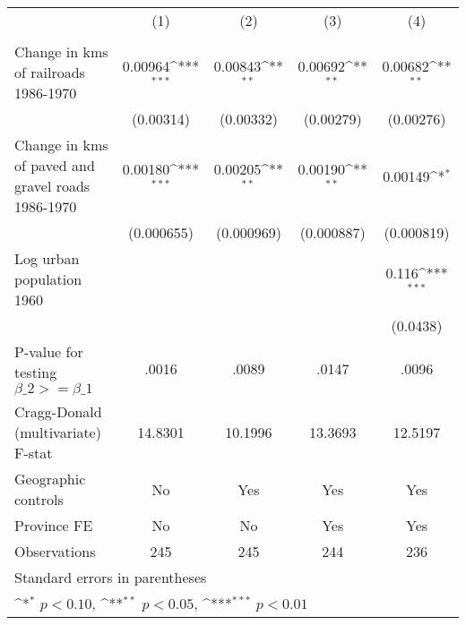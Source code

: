 {
\def\sym#1{\ifmmode^{#1}\else\(^{#1}\)\fi}
\begin{tabular}{l*{4}{c}}
\hline\hline
                &\multicolumn{1}{c}{(1)}&\multicolumn{1}{c}{(2)}&\multicolumn{1}{c}{(3)}&\multicolumn{1}{c}{(4)}\\
                &\multicolumn{1}{c}{}&\multicolumn{1}{c}{}&\multicolumn{1}{c}{}&\multicolumn{1}{c}{}\\
\hline
Change in kms of railroads 1986-1970&  0.00964\sym{***}&  0.00843\sym{**} &  0.00692\sym{**} &  0.00682\sym{**} \\
                &(0.00314)         &(0.00332)         &(0.00279)         &(0.00276)         \\
[1em]
Change in kms of paved and gravel roads 1986-1970&  0.00180\sym{***}&  0.00205\sym{**} &  0.00190\sym{**} &  0.00149\sym{*}  \\
                &(0.000655)         &(0.000969)         &(0.000887)         &(0.000819)         \\
[1em]
Log urban population 1960&                  &                  &                  &    0.116\sym{***}\\
                &                  &                  &                  & (0.0438)         \\
\hline
P-value for testing $\beta\_{2} >= \beta\_{1}$&    .0016         &    .0089         &    .0147         &    .0096         \\
Cragg-Donald (multivariate) F-stat&  14.8301         &  10.1996         &  13.3693         &  12.5197         \\
Geographic controls&       No         &      Yes         &      Yes         &      Yes         \\
Province FE     &       No         &       No         &      Yes         &      Yes         \\
Observations    &      245         &      245         &      244         &      236         \\
\hline\hline
\multicolumn{5}{l}{\footnotesize Standard errors in parentheses}\\
\multicolumn{5}{l}{\footnotesize \sym{*} \(p<0.10\), \sym{**} \(p<0.05\), \sym{***} \(p<0.01\)}\\
\end{tabular}
}
